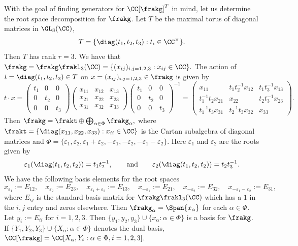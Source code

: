 \documentclass[12pt]{amsart}
\theoremstyle{plain}
\begin{document}
With the goal of finding generators for $\CC[\frakg]^T$ in mind, let us determine the root space decomposition for $\frakg$.
Let $T$ be the maximal torus of diagonal matrices in $\GL_3(\CC)$,
$$T = \{\diag(t_1, t_2, t_3) : t_i \in \CC^\times\}.$$
Then $T$ has rank $r = 3$.
We have that $\frakg = \frakg \frakl_3(\CC) = \{(x_{ij})_{i,j=1,2,3} : x_{ij} \in \CC\}.$
The action of $t = \diag(t_1, t_2, t_3) \in T$ on $x = (x_{ij})_{i,j=1,2,3} \in \frakg$ is given by
$$t \cdot x = 
\begin{pmatrix}
	t_1 & 0 & 0 \\
	0 & t_2 & 0 \\
	0 & 0 & t_3 
\end{pmatrix}
\begin{pmatrix}
	x_{11} & x_{12} & x_{13} \\
	x_{21} & x_{22} & x_{23} \\
	x_{31} & x_{32} & x_{33} 
\end{pmatrix}
\begin{pmatrix}
	t_1 & 0 & 0 \\
	0 & t_2 & 0 \\
	0 & 0 & t_3 
\end{pmatrix}^{-1} =
\begin{pmatrix}
	x_{11} & t_1 t_2^{-1} x_{12} & t_1 t_3^{-1} x_{13} \\
	t_1^{-1} t_2 x_{21} & x_{22} & t_2 t_3^{-1} x_{23} \\
	t_1^{-1} t_3 x_{31} & t_2^{-1} t_3 x_{32} & x_{33} 
\end{pmatrix}.$$
Then $\frakg = \frakt \oplus \bigoplus_{\alpha \in \Phi} \frakg_\alpha,$ where $\frakt = \{\diag(x_{11}, x_{22}, x_{33}) : x_{ii} \in \CC\}$ is the Cartan subalgebra of diagonal matrices and $\Phi = \{\varepsilon_1, \varepsilon_2, \varepsilon_1 + \varepsilon_2, -\varepsilon_1, -\varepsilon_2, -\varepsilon_1 - \varepsilon_2\}$.
Here $\varepsilon_1$ and $\varepsilon_2$ are the roots given by 
$$\varepsilon_1(\diag(t_1,t_2,t_2))=t_1 t_2^{-1}, \qquad \text{and} \qquad \varepsilon_2(\diag(t_1,t_2,t_2))=t_2 t_3^{-1}.$$
We have the following basis elements for the root spaces
$$x_{\varepsilon_1} := E_{12}, \quad x_{\varepsilon_2} := E_{23}, \quad x_{\varepsilon_1+\varepsilon_2}:=E_{13}, \quad 
x_{-\varepsilon_1} := E_{21}, \quad x_{-\varepsilon_2} := E_{32}, \quad x_{-\varepsilon_1-\varepsilon_2}:=E_{31},$$
where $E_{ij}$ is the standard basis matrix for $\frakg\frakl_3(\CC)$ which has a $1$ in the $i, j$ entry and zeros elsewhere.
Then $\frakg_\alpha=\Span\{x_\alpha\}$ for each $\alpha \in \Phi$.
Let $y_i := E_{ii}$ for $i=1, 2, 3$.
Then $\{y_1, y_2, y_3\}\cup\{x_\alpha : \alpha \in \Phi\}$ is a basis for $\frakg$.
If $\{Y_1, Y_2, Y_3\} \cup \{X_\alpha : \alpha\in\Phi\}$ denotes the dual basis, $\CC[\frakg] = \CC[X_\alpha, Y_i : \alpha \in \Phi, i=1,2,3]$.
\end{document}
